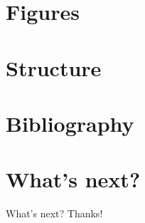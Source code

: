 \documentclass[,aspectratio=43]{beamer}
\begin{document}
\hypertarget{figures}{%
\section{Figures}\label{figures}}

\hypertarget{structure}{%
\section{Structure}\label{structure}}

\hypertarget{bibliography}{%
\section{Bibliography}\label{bibliography}}

\hypertarget{whats-next}{%
\section{What's next?}\label{whats-next}}

\begin{frame}{What's next?}
Thanks!
\end{frame}
\end{document}
